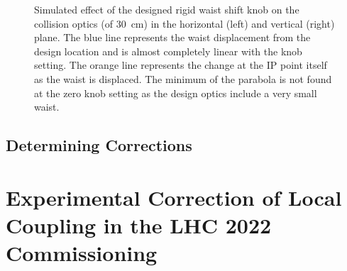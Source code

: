 \begin{figure}[htp]
    \centering
    \hspace{0.3cm}
    \caption{Simulated effect of the designed rigid waist shift knob on the collision optics (\betastar of \qty{30}{\centi\metre}) in the horizontal (left) and vertical (right) plane. The blue line represents the waist displacement from the design location and is almost completely linear with the knob setting. The orange line represents the \betafunction change at the IP point itself as the waist is displaced. The minimum of the parabola is not found at the zero knob setting as the design optics include a very small waist.}
    \label{figure:rigid_waist_shift_knob_effect2}
\end{figure}

\subsection{Determining Corrections}


\section{Experimental Correction of Local Coupling in the LHC \num{2022} Commissioning}

